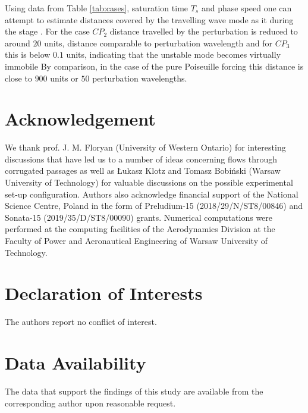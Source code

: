 \documentclass[lineno]{jfm}
\begin{document}
Using data from Table \ref{tab:cases}, saturation time $T_s$ and phase speed one can attempt to estimate distances covered by the travelling wave mode as it
  during
the  stage .
For the case $CP_2$ distance travelled by the  perturbation is reduced to around $20$ units, distance comparable to perturbation wavelength and for $CP_3$ this is below $0.1$ units,
indicating that the unstable mode becomes virtually immobile
By comparison, in the case of the pure Poiseuille forcing this distance is close to $900$ units or $50$ perturbation wavelengths.


\section*{Acknowledgement}
We thank prof. J. M. Floryan (University of Western Ontario) for interesting discussions that have led us to a number of ideas concerning flows through corrugated passages as well as Łukasz Klotz and Tomasz Bobiński (Warsaw University of Technology) for valuable discussions on the possible experimental set-up configuration.
Authors also acknowledge financial support of the National Science Centre, Poland in the form of Preludium-15 (2018/29/N/ST8/00846) and Sonata-15 (2019/35/D/ST8/00090) grants.
Numerical computations were performed at the computing facilities of the Aerodynamics Division at the Faculty of Power and Aeronautical Engineering of Warsaw University of Technology.


\section*{Declaration of Interests}
The authors report no conflict of interest.

\section*{Data Availability}
The data that support the findings of this study are available from the corresponding author upon reasonable request.
\end{document}

